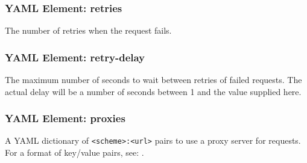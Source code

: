 \subsubsection{YAML Element: retries}\label{sec:yaml-generic-retries}
The number of retries when the request fails.

\subsubsection{YAML Element: retry-delay}\label{sec:yaml-generic-retry-delay}
The maximum number of seconds to wait between retries of failed requests. The actual
delay will be a number of seconds between 1 and the value supplied here.

\subsubsection{YAML Element: proxies}\label{sec:yaml-generic-proxies}
A YAML dictionary of \texttt{<scheme>:<url>} pairs to use a proxy server for requests. 
For a format of key/value pairs, see: .



